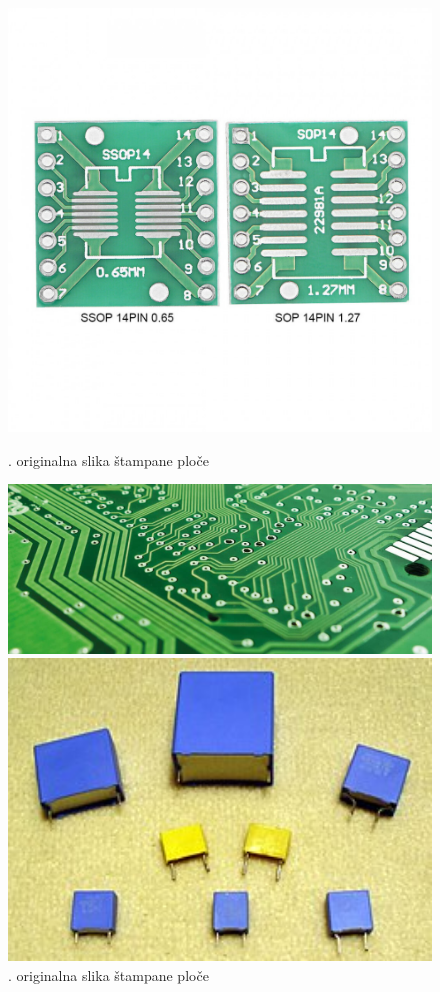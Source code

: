 \documentclass[fontsize=12bp, paper=a4]{scrarticle}
\begin{document}
\begin{figure}[hbp!]
\begin{minipage}[b]{0.2\textwidth}
        \includegraphics[width=1\textwidth]{u3.png}
        \caption{. originalna slika štampane ploče}
    \end{minipage}
    \begin{minipage}[b]{0.2\textwidth}
        \includegraphics[width=1\textwidth]{u4.png}
        \caption{. originalna slika štampane ploče }
    \end{minipage}
    \begin{minipage}[b]{0.2\textwidth}
        \includegraphics[width=1\textwidth]{u5.png}

\end{minipage}
\end{figure}
\end{document}
